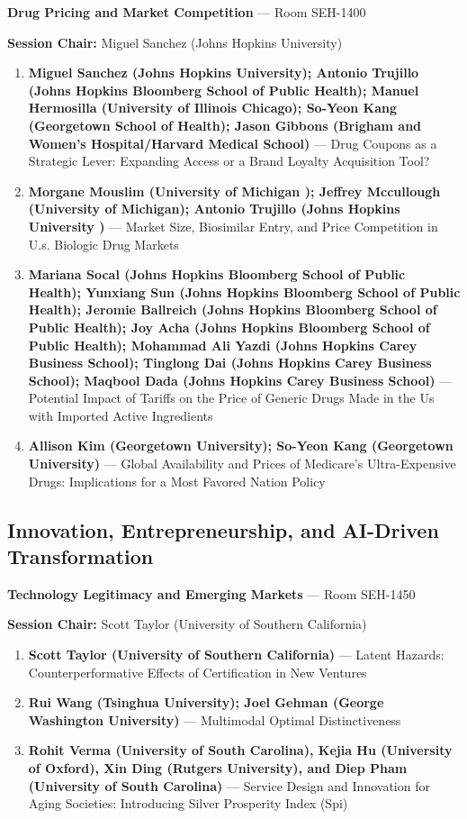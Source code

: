 \documentclass[
  10pt,
  letterpaper,
  DIV=11,
  numbers=noendperiod]{scrartcl}
\begin{document}
\textbf{Drug Pricing and Market Competition} --- Room SEH-1400

\textbf{Session Chair:} Miguel Sanchez (Johns Hopkins University)

\begin{enumerate}
\def\labelenumi{\arabic{enumi}.}
\item
  \textbf{Miguel Sanchez (Johns Hopkins University); Antonio Trujillo
  (Johns Hopkins Bloomberg School of Public Health); Manuel Hermosilla
  (University of Illinois Chicago); So-Yeon Kang (Georgetown School of
  Health); Jason Gibbons (Brigham and Women's Hospital/Harvard Medical
  School)} --- Drug Coupons as a Strategic Lever: Expanding Access or a
  Brand Loyalty Acquisition Tool?
\item
  \textbf{Morgane Mouslim (University of Michigan ); Jeffrey Mccullough
  (University of Michigan); Antonio Trujillo (Johns Hopkins University
  )} --- Market Size, Biosimilar Entry, and Price Competition in U.s.
  Biologic Drug Markets
\item
  \textbf{Mariana Socal (Johns Hopkins Bloomberg School of Public
  Health); Yunxiang Sun (Johns Hopkins Bloomberg School of Public
  Health); Jeromie Ballreich (Johns Hopkins Bloomberg School of Public
  Health); Joy Acha (Johns Hopkins Bloomberg School of Public Health);
  Mohammad Ali Yazdi (Johns Hopkins Carey Business School); Tinglong Dai
  (Johns Hopkins Carey Business School); Maqbool Dada (Johns Hopkins
  Carey Business School)} --- Potential Impact of Tariffs on the Price
  of Generic Drugs Made in the Us with Imported Active Ingredients
\item
  \textbf{Allison Kim (Georgetown University); So-Yeon Kang (Georgetown
  University)} --- Global Availability and Prices of Medicare's
  Ultra-Expensive Drugs: Implications for a Most Favored Nation Policy
\end{enumerate}

\subsection{\texorpdfstring{\textcolor{innovation}{Innovation, Entrepreneurship, and AI-Driven Transformation}}{}}\label{section-2}

\textbf{Technology Legitimacy and Emerging Markets} --- Room SEH-1450

\textbf{Session Chair:} Scott Taylor (University of Southern California)

\begin{enumerate}
\def\labelenumi{\arabic{enumi}.}
\item
  \textbf{Scott Taylor (University of Southern California)} --- Latent
  Hazards: Counterperformative Effects of Certification in New Ventures
\item
  \textbf{Rui Wang (Tsinghua University); Joel Gehman (George Washington
  University)} --- Multimodal Optimal Distinctiveness
\item
  \textbf{Rohit Verma (University of South Carolina), Kejia Hu
  (University of Oxford), Xin Ding (Rutgers University), and Diep Pham
  (University of South Carolina)} --- Service Design and Innovation for
  Aging Societies: Introducing Silver Prosperity Index (Spi)
\end{enumerate}
\end{document}
